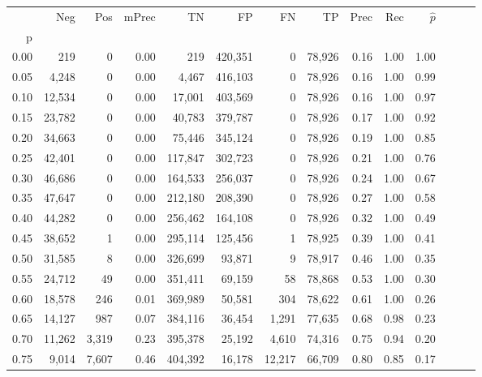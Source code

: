 \begin{tabular}{rrrrrrrrrrrrrr}
\toprule
{} &     Neg &     Pos & mPrec &       TN &       FP &      FN &      TP &  Prec &   Rec & $\hat{p}$ \\
p    &         &         &       &          &          &         &         &       &       &           \\
\midrule
0.00 &     219 &       0 &  0.00 &      219 &  420,351 &       0 &  78,926 &  0.16 &  1.00 &      1.00 \\
0.05 &   4,248 &       0 &  0.00 &    4,467 &  416,103 &       0 &  78,926 &  0.16 &  1.00 &      0.99 \\
0.10 &  12,534 &       0 &  0.00 &   17,001 &  403,569 &       0 &  78,926 &  0.16 &  1.00 &      0.97 \\
0.15 &  23,782 &       0 &  0.00 &   40,783 &  379,787 &       0 &  78,926 &  0.17 &  1.00 &      0.92 \\
0.20 &  34,663 &       0 &  0.00 &   75,446 &  345,124 &       0 &  78,926 &  0.19 &  1.00 &      0.85 \\
0.25 &  42,401 &       0 &  0.00 &  117,847 &  302,723 &       0 &  78,926 &  0.21 &  1.00 &      0.76 \\
0.30 &  46,686 &       0 &  0.00 &  164,533 &  256,037 &       0 &  78,926 &  0.24 &  1.00 &      0.67 \\
0.35 &  47,647 &       0 &  0.00 &  212,180 &  208,390 &       0 &  78,926 &  0.27 &  1.00 &      0.58 \\
0.40 &  44,282 &       0 &  0.00 &  256,462 &  164,108 &       0 &  78,926 &  0.32 &  1.00 &      0.49 \\
0.45 &  38,652 &       1 &  0.00 &  295,114 &  125,456 &       1 &  78,925 &  0.39 &  1.00 &      0.41 \\
0.50 &  31,585 &       8 &  0.00 &  326,699 &   93,871 &       9 &  78,917 &  0.46 &  1.00 &      0.35 \\
0.55 &  24,712 &      49 &  0.00 &  351,411 &   69,159 &      58 &  78,868 &  0.53 &  1.00 &      0.30 \\
0.60 &  18,578 &     246 &  0.01 &  369,989 &   50,581 &     304 &  78,622 &  0.61 &  1.00 &      0.26 \\
0.65 &  14,127 &     987 &  0.07 &  384,116 &   36,454 &   1,291 &  77,635 &  0.68 &  0.98 &      0.23 \\
0.70 &  11,262 &   3,319 &  0.23 &  395,378 &   25,192 &   4,610 &  74,316 &  0.75 &  0.94 &      0.20 \\
0.75 &   9,014 &   7,607 &  0.46 &  404,392 &   16,178 &  12,217 &  66,709 &  0.80 &  0.85 &      0.17 \\

\end{tabular}

